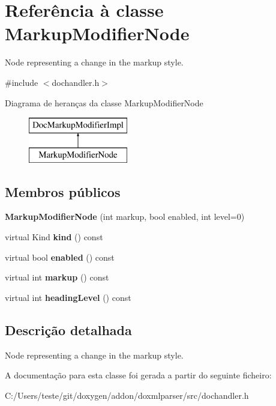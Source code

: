 \hypertarget{class_markup_modifier_node}{\section{Referência à classe Markup\-Modifier\-Node}
\label{class_markup_modifier_node}
}


Node representing a change in the markup style.  




{\ttfamily \#include $<$dochandler.\-h$>$}

Diagrama de heranças da classe Markup\-Modifier\-Node\begin{figure}[H]
\begin{center}
\leavevmode
\includegraphics[height=2.000000cm]{class_markup_modifier_node}
\end{center}
\end{figure}
\subsection*{Membros públicos}
\begin{DoxyCompactItemize}
\item 
\hypertarget{class_markup_modifier_node_a1ee1ea18cbc30a5b4c76e00f27cabfe4}{{\bfseries Markup\-Modifier\-Node} (int markup, bool enabled, int level=0)}\label{class_markup_modifier_node_a1ee1ea18cbc30a5b4c76e00f27cabfe4}

\item 
\hypertarget{class_markup_modifier_node_af8e62c8a81ddf2283205cc8955de50eb}{virtual Kind {\bfseries kind} () const }\label{class_markup_modifier_node_af8e62c8a81ddf2283205cc8955de50eb}

\item 
\hypertarget{class_markup_modifier_node_a1ab8977897dfa8f13ee985f9a10457c3}{virtual bool {\bfseries enabled} () const }\label{class_markup_modifier_node_a1ab8977897dfa8f13ee985f9a10457c3}

\item 
\hypertarget{class_markup_modifier_node_a078c178bc3d5ae1b49603c380f6ab0b9}{virtual int {\bfseries markup} () const }\label{class_markup_modifier_node_a078c178bc3d5ae1b49603c380f6ab0b9}

\item 
\hypertarget{class_markup_modifier_node_a5b2ef967a93a14add13c4debc0641feb}{virtual int {\bfseries heading\-Level} () const }\label{class_markup_modifier_node_a5b2ef967a93a14add13c4debc0641feb}

\end{DoxyCompactItemize}


\subsection{Descrição detalhada}
Node representing a change in the markup style. 



A documentação para esta classe foi gerada a partir do seguinte ficheiro\-:\begin{DoxyCompactItemize}
\item 
C\-:/\-Users/teste/git/doxygen/addon/doxmlparser/src/dochandler.\-h\end{DoxyCompactItemize}
